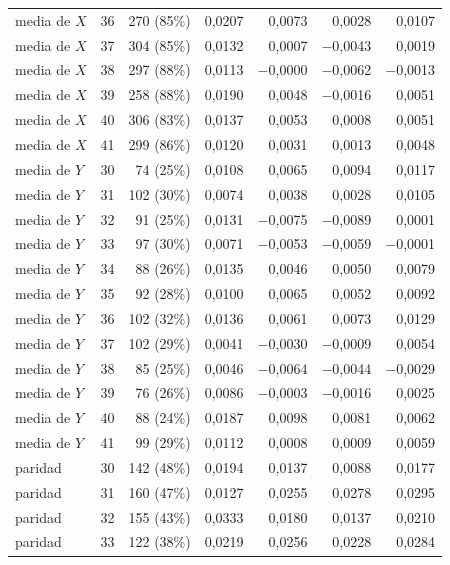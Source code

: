 \begin{table}[htbp]
{\begin{tabular}{@{}lrrrrrr@{}}
        media de $X$ & 36 & 270 (85\%) & 0,0207 & 0,0073 & 0,0028 & 0,0107 \\
        media de $X$ & 37 & 304 (85\%) & 0,0132 & 0,0007 & $-$0,0043 & 0,0019 \\
        media de $X$ & 38 & 297 (88\%) & 0,0113 & $-$0,0000 & $-$0,0062 & $-$0,0013 \\
        media de $X$ & 39 & 258 (88\%) & 0,0190 & 0,0048 & $-$0,0016 & 0,0051 \\
        media de $X$ & 40 & 306 (83\%) & 0,0137 & 0,0053 & 0,0008 & 0,0051 \\
        media de $X$ & 41 & 299 (86\%) & 0,0120 & 0,0031 & 0,0013 & 0,0048 \\
        media de $Y$ & 30 & 74 (25\%) & 0,0108 & 0,0065 & 0,0094 & 0,0117 \\
        media de $Y$ & 31 & 102 (30\%) & 0,0074 & 0,0038 & 0,0028 & 0,0105 \\
        media de $Y$ & 32 & 91 (25\%) & 0,0131 & $-$0,0075 & $-$0,0089 & 0,0001 \\
        media de $Y$ & 33 & 97 (30\%) & 0,0071 & $-$0,0053 & $-$0,0059 & $-$0,0001 \\
        media de $Y$ & 34 & 88 (26\%) & 0,0135 & 0,0046 & 0,0050 & 0,0079 \\
        media de $Y$ & 35 & 92 (28\%) & 0,0100 & 0,0065 & 0,0052 & 0,0092 \\
        media de $Y$ & 36 & 102 (32\%) & 0,0136 & 0,0061 & 0,0073 & 0,0129 \\
        media de $Y$ & 37 & 102 (29\%) & 0,0041 & $-$0,0030 & $-$0,0009 & 0,0054 \\
        media de $Y$ & 38 & 85 (25\%) & 0,0046 & $-$0,0064 & $-$0,0044 & $-$0,0029 \\
        media de $Y$ & 39 & 76 (26\%) & 0,0086 & $-$0,0003 & $-$0,0016 & 0,0025 \\
        media de $Y$ & 40 & 88 (24\%) & 0,0187 & 0,0098 & 0,0081 & 0,0062 \\
        media de $Y$ & 41 & 99 (29\%) & 0,0112 & 0,0008 & 0,0009 & 0,0059 \\
        paridad & 30 & 142 (48\%) & 0,0194 & 0,0137 & 0,0088 & 0,0177 \\
        paridad & 31 & 160 (47\%) & 0,0127 & 0,0255 & 0,0278 & 0,0295 \\
        paridad & 32 & 155 (43\%) & 0,0333 & 0,0180 & 0,0137 & 0,0210 \\
        paridad & 33 & 122 (38\%) & 0,0219 & 0,0256 & 0,0228 & 0,0284 \\

\end{tabular}}
\end{table}
